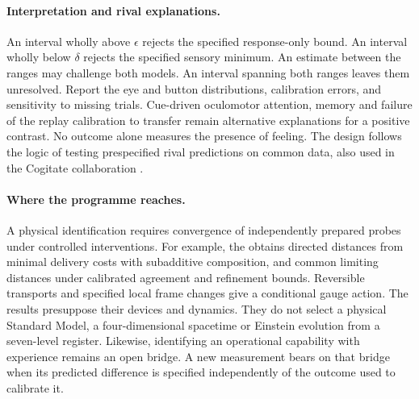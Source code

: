 \paragraph{Interpretation and rival explanations.}
An interval wholly above $\epsilon$ rejects the specified response-only bound. An interval wholly below $\delta$ rejects the specified sensory minimum. An estimate between the ranges may challenge both models. An interval spanning both ranges leaves them unresolved. Report the eye and button distributions, calibration errors, and sensitivity to missing trials. Cue-driven oculomotor attention, memory and failure of the replay calibration to transfer remain alternative explanations for a positive contrast. No outcome alone measures the presence of feeling. The design follows the logic of testing prespecified rival predictions on common data, also used in the Cogitate collaboration \citep{cogitate2025}.

\paragraph{Where the programme reaches.}
A physical identification requires convergence of independently prepared probes under controlled interventions. For example, the  obtains directed distances from minimal delivery costs with subadditive composition, and common limiting distances under calibrated agreement and refinement bounds. Reversible transports and specified local frame changes give a conditional gauge action. The results presuppose their devices and dynamics. They do not select a physical Standard Model, a four-dimensional spacetime or Einstein evolution from a seven-level register. Likewise, identifying an operational capability with experience remains an open bridge. A new measurement bears on that bridge when its predicted difference is specified independently of the outcome used to calibrate it.

